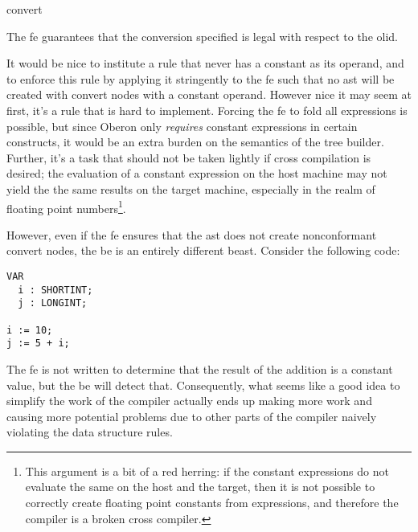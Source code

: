 \begin{instruction}{convert}

  \begin{notes}
    The \ac{fe} guarantees that the conversion specified is legal with
    respect to the \ac{olid}.

    It would be nice to institute a rule that  never
    has a constant as its operand, and to enforce this rule by
    applying it stringently to the \ac{fe} such that no \ac{ast} will
    be created with convert nodes with a constant operand.  However
    nice it may seem at first, it's a rule that is hard to implement.
    Forcing the \ac{fe} to fold all expressions is possible, but since
    Oberon only \emph{requires} constant expressions in certain
    constructs, it would be an extra burden on the semantics of the
    tree builder.  Further, it's a task that should not be taken
    lightly if cross compilation is desired; the evaluation of a
    constant expression on the host machine may not yield the the same
    results on the target machine, especially in the realm of floating
    point numbers\footnote{This argument is a bit of a red herring: if
      the constant expressions do not evaluate the same on the host
      and the target, then it is not possible to correctly create
      floating point constants from expressions, and therefore the
      compiler is a broken cross compiler.}.

    However, even if the \ac{fe} ensures that the \ac{ast} does not
    create nonconformant convert nodes, the \ac{be} is an entirely
    different beast.  Consider the following code:

\begin{verbatim}
VAR
  i : SHORTINT;
  j : LONGINT;

i := 10;
j := 5 + i;
\end{verbatim}

    The \ac{fe} is not written to determine that the result of the
    addition is a constant value, but the \ac{be} will detect that.
    Consequently, what seems like a good idea to simplify the work of
    the compiler actually ends up making more work and causing more
    potential problems due to other parts of the compiler naively
    violating the data structure rules.


\end{notes}
\end{instruction}
